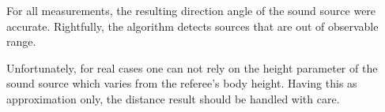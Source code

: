For all measurements, the resulting direction angle of the sound source were
accurate.
Rightfully, the algorithm detects sources that are out of observable range.

Unfortunately, for real cases one can not rely on the height parameter of the sound
source which varies from the referee's body height.
Having this as approximation only, the distance result should be handled
with care.